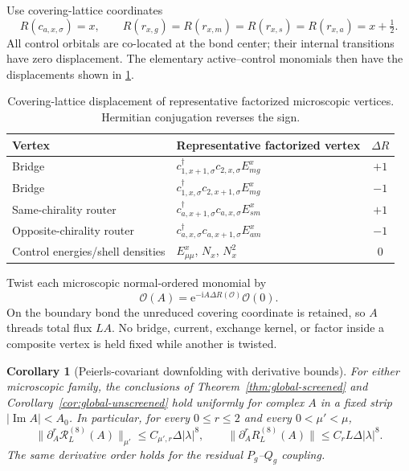 \documentclass[11pt]{article}
\newtheorem{corollary}[theorem]{Corollary}
\theoremstyle{definition}
\theoremstyle{remark}
\newcommand{\I}{\mathrm i}
\newcommand{\e}{\mathrm e}
\newcommand{\abs}[1]{\lvert #1\rvert}
\newcommand{\norm}[1]{\lVert #1\rVert}
\begin{document}
Use covering-lattice coordinates
\begin{equation}
 R(c_{a,x,\sigma})=x,
 \qquad
 R(r_{x,g})=R(r_{x,m})=R(r_{x,s})=R(r_{x,a})=x+\tfrac12.
 \label{eq:position-assignment}
\end{equation}
All control orbitals are co-located at the bond center; their internal transitions have zero displacement.  The elementary active--control monomials then have the displacements shown in \cref{tab:displacements}.

\begin{table}[H]
\centering
\caption{Covering-lattice displacement of representative factorized microscopic vertices.  Hermitian conjugation reverses the sign.}
\label{tab:displacements}
\begin{tabular}{@{}llc@{}}
\toprule
Vertex & Representative factorized vertex & $\Delta R$\\
\midrule
Bridge & $c_{1,x+1,\sigma}^\dagger c_{2,x,\sigma}E^x_{mg}$ & $+1$\\
Bridge & $c_{1,x,\sigma}^\dagger c_{2,x+1,\sigma}E^x_{mg}$ & $-1$\\
Same-chirality router & $c_{a,x+1,\sigma}^\dagger c_{a,x,\sigma}E^x_{sm}$ & $+1$\\
Opposite-chirality router & $c_{a,x,\sigma}^\dagger c_{a,x+1,\sigma}E^x_{am}$ & $-1$\\
Control energies/shell densities & $E^x_{\mu\mu}$, $N_x$, $N_x^2$ & $0$\\
\bottomrule
\end{tabular}
\end{table}

Twist each microscopic normal-ordered monomial by
\begin{equation}
 \mathcal O(A)=\e^{-\I A\Delta R(\mathcal O)}\mathcal O(0).
 \label{eq:peierls-monomial}
\end{equation}
On the boundary bond the unreduced covering coordinate is retained, so $A$ threads total flux $LA$.  No bridge, current, exchange kernel, or factor inside a composite vertex is held fixed while another is twisted.

\begin{corollary}[Peierls-covariant downfolding with derivative bounds]
\label{cor:peierls}
For either microscopic family, the conclusions of Theorem~\ref{thm:global-screened} and Corollary~\ref{cor:global-unscreened} hold uniformly for complex $A$ in a fixed strip $\abs{\operatorname{Im}A}<A_0$.  In particular, for every $0\le r\le2$ and every $0<\mu'<\mu$,
\begin{equation}
 \boxed{\norm{\partial_A^r\mathcal R_L^{(8)}(A)}_{\mu'}
 \le C_{\mu',r}\Delta\abs\lambda^8,}
 \qquad
 \boxed{\norm{\partial_A^rR_L^{(8)}(A)}
 \le C_rL\Delta\abs\lambda^8.}
 \label{eq:peierls-derivative-bound}
\end{equation}
The same derivative order holds for the residual $P_g$--$Q_g$ coupling.
\end{corollary}
\end{document}
